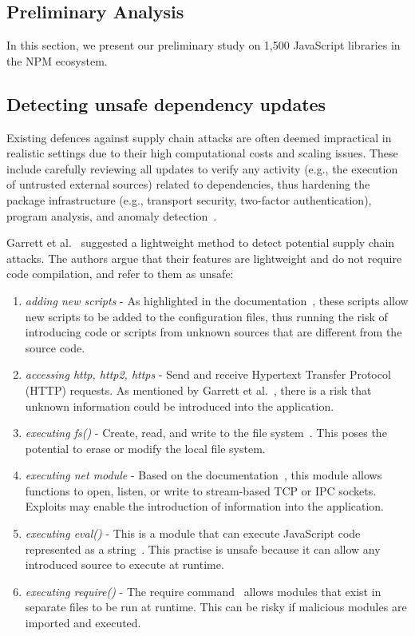 \documentclass[sigconf,screen]{acmart}
\begin{document}
\begin{sloppy}
\section{Preliminary Analysis}
In this section, we present our preliminary study on 1,500 JavaScript libraries in the NPM ecosystem.
\subsection{Detecting unsafe dependency updates}

Existing defences against supply chain attacks are often deemed impractical in realistic settings due to their high computational costs and scaling issues.
These include carefully reviewing all updates to verify any activity (e.g., the execution of untrusted external sources) related to dependencies, thus hardening the package infrastructure (e.g., transport security, two-factor authentication), program analysis, and anomaly detection~\citep{Thecompl84:online, Nikitin:2017, Livshits:2009, GarrettICSE-NIER19}. 

Garrett et al.~\citep{GarrettICSE-NIER19} suggested a lightweight method to detect potential supply chain attacks.
The authors argue that their features are lightweight and do not require code compilation, and refer to them as unsafe:
\begin{enumerate}
    \item \textit{adding new scripts} - As highlighted in the documentation~\citep{Aboutnpm57:online}, these scripts allow new scripts to be added to the configuration files, thus running the risk of introducing code or scripts from unknown sources that are different from the source code.
    \item \textit{accessing http, http2, https} - Send and receive Hypertext Transfer Protocol (HTTP) requests. As mentioned by Garrett et al.~\citep{GarrettICSE-NIER19}, there is a risk that unknown information could be introduced into the application.
    \item \textit{executing fs()} - Create, read, and write to the file system~\citep{Filesyst74:online}. This poses the potential to erase or modify the local file system.
    \item \textit{executing net module} - Based on the documentation~\citep{NetNodej20:online}, this module allows functions to open, listen, or write to stream-based TCP or IPC sockets. Exploits may enable the introduction of information into the application.
    \item \textit{executing eval()} - This is a module that can execute JavaScript code represented as a string~\citep{evalJava75:online}. This practise is unsafe because it can allow any introduced source to execute at runtime.
    \item \textit{executing require()} - The require command~\citep{JavaScri65:online} allows modules that exist in separate files to be run at runtime. This can be risky if malicious modules are imported and executed. 
\end{enumerate}


\end{sloppy}
\end{document}

